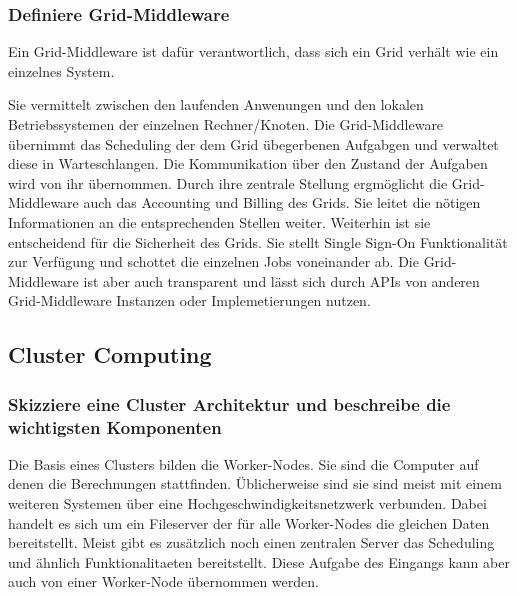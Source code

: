 \subsubsection{Definiere Grid-Middleware}
	Ein Grid-Middleware ist daf\"ur verantwortlich,
	dass sich ein Grid verh\"alt wie ein einzelnes System.
	
	Sie vermittelt zwischen den laufenden Anwenungen und den lokalen
	Betriebssystemen der einzelnen Rechner/Knoten.
	Die Grid-Middleware \"ubernimmt das Scheduling der dem Grid \"ubegerbenen
	Aufgabgen und verwaltet diese in Warteschlangen.
	Die Kommunikation \"uber den Zustand der Aufgaben wird von ihr \"ubernommen.
	Durch ihre zentrale Stellung ergm\"oglicht die Grid-Middleware auch
	das Accounting und Billing des Grids.
	Sie leitet die n\"otigen Informationen an die entsprechenden Stellen weiter.
	Weiterhin ist sie entscheidend f\"ur die Sicherheit des Grids.
	Sie stellt Single Sign-On Funktionalit\"at zur Verf\"ugung und
	schottet die einzelnen Jobs voneinander ab.
	Die Grid-Middleware ist aber auch transparent und l\"asst sich durch APIs
	von anderen Grid-Middleware Instanzen oder Implemetierungen nutzen.

\subsection{Cluster Computing}
	\subsubsection{Skizziere eine Cluster Architektur und beschreibe die wichtigsten Komponenten}

	Die Basis eines Clusters bilden die Worker-Nodes.
	Sie sind die Computer auf denen die Berechnungen stattfinden.
	\"Ublicherweise sind sie sind meist mit einem weiteren Systemen \"uber
	eine Hochgeschwindigkeitsnetzwerk verbunden.
	Dabei handelt es sich um ein Fileserver der f\"ur alle Worker-Nodes
	die gleichen Daten bereitstellt.
	Meist gibt es zus\"atzlich noch einen zentralen Server das Scheduling und ähnlich Funktionalitaeten
	bereitstellt.
	Diese Aufgabe des Eingangs kann aber auch von einer Worker-Node \"ubernommen werden.

